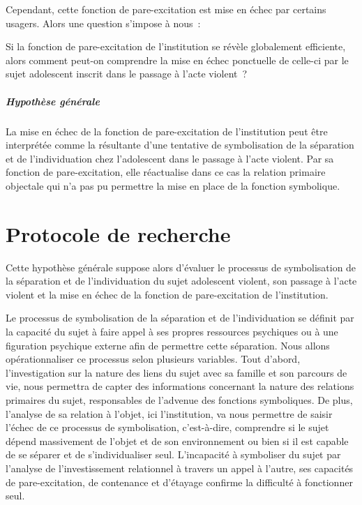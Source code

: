 \documentclass[12pt, a4paper]{book}
\begin{document}
\begin{spacing}{1.5}
Cependant, cette fonction de pare-excitation est mise en échec par certains usagers. Alors une question s'impose à nous :

Si la fonction de pare-excitation de l'institution se révèle globalement efficiente, alors comment peut-on comprendre la mise en échec ponctuelle de celle-ci par le sujet adolescent inscrit dans le passage à l'acte violent ?

\paragraph{Hypothèse générale}

La mise en échec de la fonction de pare-excitation de l'institution peut être interprétée comme la résultante d'une tentative de symbolisation de la séparation et de l'individuation chez l'adolescent dans le passage à l'acte violent. Par sa fonction de pare-excitation, elle réactualise dans ce cas la relation primaire objectale qui n'a pas pu permettre la mise en place de la fonction symbolique.

\chapter{Protocole de recherche}

Cette hypothèse générale suppose alors d'évaluer le processus de symbolisation de la séparation et de l'individuation du sujet adolescent violent, son passage à l'acte violent et la mise en échec de la fonction de pare-excitation de l'institution.

Le processus de symbolisation de la séparation et de l'individuation se définit par la capacité du sujet à faire appel à ses propres ressources psychiques ou à une figuration psychique externe afin de permettre cette séparation. Nous allons opérationnaliser ce processus selon plusieurs variables. Tout d'abord, l'investigation sur la nature des liens du sujet avec sa famille et son parcours de vie, nous permettra de capter des informations concernant la nature des relations primaires du sujet, responsables de l'advenue des fonctions symboliques. De plus, l'analyse de sa relation à l'objet, ici l'institution, va nous permettre de saisir l'échec de ce processus de symbolisation, c'est-à-dire, comprendre si le sujet dépend massivement de l'objet et de son environnement ou bien si il est capable de se séparer et de s'individualiser seul. L'incapacité à symboliser du sujet par l'analyse de l'investissement relationnel à travers un appel à l'autre, ses capacités de pare-excitation, de contenance et d'étayage confirme la difficulté à fonctionner seul. 


\end{spacing}
\end{document}

